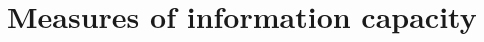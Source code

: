 \chapter{Measures of information capacity}

%

\def\Fone{$\mathcal{F}$}
\def\Ftwo{$\mathcal{G}$}
\def\Ftrue{$\Theta$}


